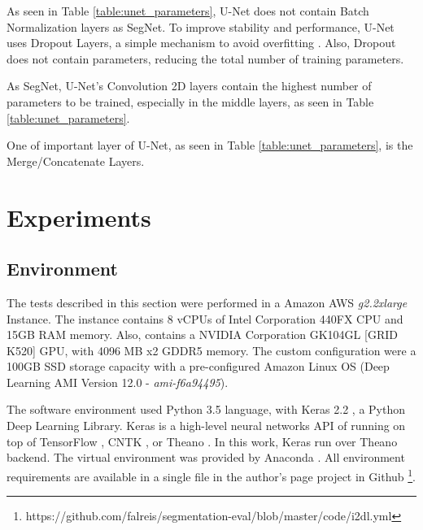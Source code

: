 \documentclass[10pt,twocolumn,letterpaper]{article}
\begin{document}
As seen in Table \ref{table:unet_parameters}, U-Net does not contain Batch Normalization layers as SegNet. To improve stability and performance, U-Net uses Dropout Layers, a simple mechanism to avoid overfitting \cite{DROPOUT}. Also, Dropout does not contain parameters, reducing the total number of training parameters.

As SegNet, U-Net's Convolution 2D layers contain the highest number of parameters to be trained, especially in the middle layers, as seen in Table \ref{table:unet_parameters}.

One of important layer of U-Net, as seen in Table \ref{table:unet_parameters}, is the Merge/Concatenate Layers. %

\section{Experiments} \label{sec:experiments}


\subsection{Environment} \label{ssec:environment}

The tests described in this section were performed in a Amazon AWS \cite{AMAZON_WEBSITE} \textit{g2.2xlarge} Instance. The instance contains 8 vCPUs of Intel Corporation 440FX CPU and 15GB RAM memory. Also, contains a NVIDIA Corporation GK104GL [GRID K520] GPU, with 4096 MB x2 GDDR5 memory. The custom configuration were a 100GB SSD storage capacity with a pre-configured Amazon Linux OS (Deep Learning AMI Version 12.0 - \textit{ami-f6a94495}).

The software environment used Python 3.5 \cite{PYTHON_WEBSITE} language, with Keras 2.2 \cite{KERAS}, a Python Deep Learning Library. Keras is a high-level neural networks API of running on top of TensorFlow \cite{TENSORFLOW}, CNTK \cite{CNTK}, or Theano \cite{THEANO} \cite{KERAS}. In this work, Keras run over Theano \cite{THEANO} backend. The virtual environment was provided by Anaconda \cite{ANACONDA_WEBSITE}. All environment requirements are available in a single file in the author's page project in Github \footnote{https://github.com/falreis/segmentation-eval/blob/master/code/i2dl.yml}.
\end{document}
